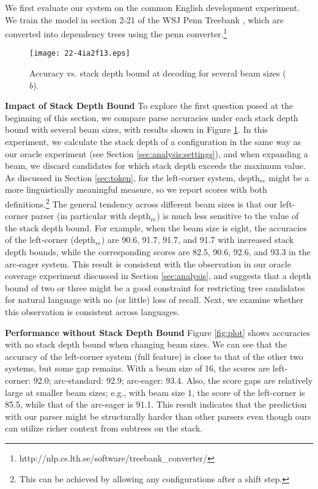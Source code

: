 \documentclass[english]{jnlp_1.4}
\begin{document}
We first evaluate our system on the common English development experiment.
We train the model in section 2-21 of the WSJ Penn Treebank \cite{Marcus93buildinga}, which are converted into dependency trees using the penn converter.\footnote{http://nlp.cs.lth.se/software/treebank\_converter/}

\begin{figure}[b]
\begin{center}
\texttt{[image: 22-4ia2f13.eps]}
\end{center}
\caption{Accuracy vs. stack depth bound at decoding for several beam sizes ($b$).}
\label{fig:accuracy-depth}
\end{figure}

    \noindent\textbf{Impact of Stack Depth Bound}
To explore the first question posed at the beginning of this section, we compare parse accuracies under each stack depth bound with several beam sizes, with results shown in Figure \ref{fig:accuracy-depth}.
In this experiment, we calculate the stack depth of a configuration in the same way as our oracle experiment (see Section \ref{sec:analysis:settings}), and when expanding a beam, we discard candidates for which stack depth exceeds the maximum value.
As discussed in Section \ref{sec:token}, for the left-corner system, depth$_{re}$ might be a more linguistically meaningful measure, so we report scores with both definitions.\footnote{This can be achieved by allowing any configurations after a shift step.}
The general tendency across different beam sizes is that our left-corner parser (in particular with depth$_{re}$) is much less sensitive to the value of the stack depth bound.
For example, when the beam size is eight, the accuracies of the left-corner (depth$_{re}$) are 90.6, 91.7, 91.7, and 91.7 with increased stack depth bounds, while the corresponding scores are 82.5, 90.6, 92.6, and 93.3 in the arc-eager system.
This result is consistent with the observation in our oracle coverage experiment discussed in Section \ref{sec:analysis}, and suggests that a depth bound of two or three might be a good constraint for restricting tree candidates for natural language with no (or little) loss of recall.
Next, we examine whether this observation is consistent across languages.

    \noindent\textbf{Performance without Stack Depth Bound}
Figure \ref{fig:plot} shows accuracies with no stack depth bound when changing beam sizes.
We can see that the accuracy of the left-corner system (full feature) is close to that of the other two systems, but some gap remains.
With a beam size of 16, the scores are
left-corner: 92.0;
arc-standard: 92.9;
arc-eager: 93.4.
Also, the score gaps are relatively large at smaller beam sizes;
e.g., with beam size 1, the score of the left-corner is 85.5, while that of the arc-eager is 91.1.
This result indicates that the prediction with our parser might be structurally harder than other parsers even though ours can utilize richer context from subtrees on the stack.
\end{document}
